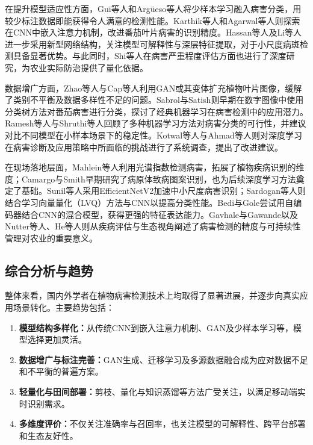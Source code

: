 在提升模型适应性方面，Gui等人\cite{9}和Argüeso等人\cite{10}将少样本学习融入病害分类，用较少标注数据即能获得令人满意的检测性能。Karthik等人\cite{11}和Agarwal等人\cite{12}则探索在CNN中嵌入注意力机制，改进番茄叶片病害的识别精度。Hassan等人\cite{13}及Li等人\cite{14}进一步采用新型网络结构，关注模型可解释性与深层特征提取，对于小尺度病斑检测具备显著优势。与此同时，Shi等人\cite{15}在病害严重程度评估方面也进行了深度研究，为农业实际防治提供了量化依据。

数据增广方面，Zhao等人\cite{21}与Cap等人\cite{23}利用GAN或其变体扩充植物叶片图像，缓解了类别不平衡及数据多样性不足的问题。Sabrol与Satish\cite{24}则早期在数字图像中使用分类树方法对番茄病害进行分类，探讨了经典机器学习在病害检测中的应用潜力。Ramesh等人\cite{16}与Shruthi等人\cite{17}回顾了多种机器学习方法对病害分类的可行性，并建议对比不同模型在小样本场景下的稳定性。Kotwal等人\cite{18}与Ahmad等人\cite{19}则对深度学习在病害诊断及应用策略中所面临的挑战进行了系统调查，提出了改进建议。

在现场落地层面，Mahlein等人\cite{20}利用光谱指数检测病害，拓展了植物疾病识别的维度；Camargo与Smith\cite{30}早期研究了病原体致病图案识别，也为后续深度学习方法奠定了基础。Sunil等人\cite{31}采用EfficientNetV2加速中小尺度病害识别；Sardogan等人\cite{32}则结合学习向量量化（LVQ）方法与CNN以提高分类性能。Bedi与Gole\cite{25}尝试用自编码器结合CNN的混合模型，获得更强的特征表达能力。Gavhale与Gawande\cite{26}以及Nutter等人\cite{27}、He等人\cite{28}则从疾病评估与生态视角阐述了病害检测的精度与可持续性管理对农业的重要意义。
\subsection{综合分析与趋势}
整体来看，国内外学者在植物病害检测技术上均取得了显著进展，并逐步向真实应用场景转化。主要趋势包括：

\begin{enumerate}
	\item {\bfseries 模型结构多样化：}从传统CNN到嵌入注意力机制、GAN及少样本学习等，模型选择更加灵活\cite{8,11,12,21}。
	\item {\bfseries 数据增广与标注完善：}GAN生成、迁移学习及多源数据融合成为应对数据不足和不平衡的普遍方案\cite{9,21,23}。
	\item {\bfseries 轻量化与田间部署：}剪枝、量化与知识蒸馏等方法广受关注，以满足移动端实时识别需求\cite{4,5,13,14}。
	\item {\bfseries 多维度评价：}不仅关注准确率与召回率，也关注模型的可解释性、跨平台部署和生态友好性\cite{22,28,29}。
\end{enumerate}

